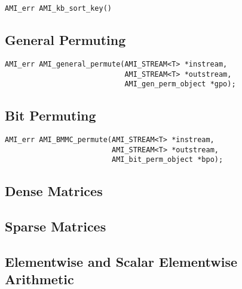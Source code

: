 \begin{verbatim}
AMI_err AMI_kb_sort_key()
\end{verbatim}


\subsection{General Permuting}
\label{sec:ref-ami-gp}


\tobeextended

\begin{verbatim}
AMI_err AMI_general_permute(AMI_STREAM<T> *instream, 
                            AMI_STREAM<T> *outstream, 
                            AMI_gen_perm_object *gpo);
\end{verbatim}

\subsection{Bit Permuting}
\label{sec:ref-ami-bp}


\tobeextended

\begin{verbatim}
AMI_err AMI_BMMC_permute(AMI_STREAM<T> *instream, 
                         AMI_STREAM<T> *outstream, 
                         AMI_bit_perm_object *bpo);
\end{verbatim}

\subsection{Dense Matrices}
\label{sec:ref-ami-matrix}


\tobewritten


\subsection{Sparse Matrices}
\label{sec:ref-ami-sm}


\tobewritten


\subsection{Elementwise and Scalar Elementwise Arithmetic}
\label{sec:ref-ami-arith}

